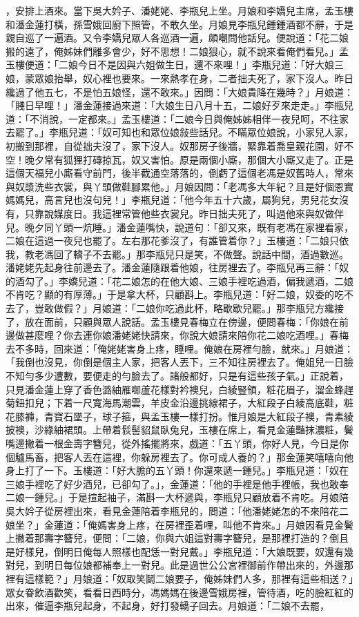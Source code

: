 ，安排上酒來。當下吳大妗子、潘姥姥、李瓶兒上坐。月娘和李嬌兒主席，孟玉樓和潘金蓮打橫，孫雪娥回廚下照管，不敢久坐。月娘見李瓶兒鍾鍾酒都不辭，于是親自巡了一遍酒。又令李嬌兒眾人各巡酒一遍，頗嘲問他話兒。便說道：「花二娘搬的遠了，俺姊妹們離多會少，好不思想！二娘狠心，就不說來看俺們看兒。」孟玉樓便道：「二娘今日不是因與六姐做生日，還不來哩！」李瓶兒道：「好大娘三娘，蒙眾娘抬舉，奴心裡也要來。一來熱孝在身，二者拙夫死了，家下沒人。昨日纔過了他五七，不是怕五娘怪，還不敢來。」因問：「大娘貴降在幾時？」月娘道：「賤日早哩！」潘金蓮接過來道：「大娘生日八月十五，二娘好歹來走走。」李瓶兒道：「不消說，一定都來。」孟玉樓道：「二娘今日與俺姊姊相伴一夜兒呵，不往家去罷了。」李瓶兒道：「奴可知也和眾位娘敍些話兒。不瞞眾位娘說，小家兒人家，初搬到那裡，自從拙夫沒了，家下沒人。奴那房子後牆，緊靠着喬皇親花園，好不空！晚夕常有狐狸打磚掠瓦，奴又害怕。原是兩個小廝，那個大小廝又走了。正是這個天福兒小廝看守前門，後半截通空落落的，倒虧了這個老馮是奴舊時人，常來與奴漿洗些衣裳，與丫頭做鞋腳累他。」月娘因問：「老馮多大年紀？且是好個恩實媽媽兒，高言兒也沒句兒！」李瓶兒道：「他今年五十六歲，屬狗兒，男兒花女沒有，只靠說媒度日。我這裡常管他些衣裳兒。昨日拙夫死了，叫過他來與奴做伴兒。晚夕同丫頭一炕睡。」潘金蓮嘴快，說道句：「卻又來，既有老馮在家裡看家，二娘在這過一夜兒也罷了。左右那花爹沒了，有誰管着你？」玉樓道：「二娘只依我，教老馮回了轎子不去罷。」那李瓶兒只是笑，不做聲。說話中間，酒過數巡。潘姥姥先起身往前邊去了。潘金蓮隨跟着他娘，往房裡去了。李瓶兒再三辭：「奴的酒勾了。」李嬌兒道：「花二娘怎的在他大娘、三娘手裡吃過酒，偏我遞酒，二娘不肯吃？顯的有厚薄。」于是拿大杯，只顧斟上。李瓶兒道：「好二娘，奴委的吃不去了，豈敢做假？」月娘道：「二娘你吃過此杯，略歇歇兒罷。」那李瓶兒方纔接了，放在面前，只顧與眾人說話。孟玉樓見春梅立在傍邊，便問春梅：「你娘在前邊做甚麼哩？你去連你娘潘姥姥快請來，你說大娘請來陪你花二娘吃酒哩。」春梅去不多時，回來道：「俺姥姥害身上疼，睡哩。俺娘在房裡勻臉，就來。」月娘道：「我倒也沒見，你倒是個主人家，把客人丟下，三不知往房裡去了。俺姐兒一日臉不知勻多少遭數，要便走的勻臉去了。諸般都好，只是有這些孩子氣。」正說着，只見潘金蓮上穿了香色潞紬雁啣蘆花樣對衿襖兒，白綾豎領，粧花眉子，溜金蜂趕菊鈕扣兒；下着一尺寬海馬潮雲，羊皮金沿邊挑線裙子，大紅段子白綾高底鞋，粧花膝褲，青寶石墜子，球子箍，與孟玉樓一樣打扮。惟月娘是大紅段子襖，青素綾披襖，沙綠紬裙頭。上帶着䯼髻貂鼠臥兔兒，玉樓在席上，看見金蓮豔抹濃粧，鬢嘴邊撇着一根金壽字簪兒，從外搖擺將來，戲道：「五丫頭，你好人見，今日是你個驢馬畜，把客人丟在這裡，你躲房裡去了。你可成人養的？」那金蓮笑嘻嘻向他身上打了一下。玉樓道：「好大膽的五丫頭！你還來遞一鍾兒。」李瓶兒道：「奴在三娘手裡吃了好少酒兒，已卻勾了。」，金蓮道：「他的手裡是他手裡帳，我也敢奉二娘一鍾兒。」于是揎起袖子，滿斟一大杯遞與，李瓶兒只顧放着不肯吃。月娘陪吳大妗子從房裡出來，看見金蓮陪着李瓶兒的，問道：「他潘姥姥怎的不來陪花二娘坐？」金蓮道：「俺媽害身上疼，在房裡歪着哩，叫他不肯來。」月娘因看見金鬢上撇着那壽字簪兒，便問：「二娘，你與六姐這對壽字簪兒，是那裡打造的？倒且是好樣兒，倒明日俺每人照樣也配恁一對兒戴。」李瓶兒道：「大娘既要，奴還有幾對兒，到明日每位娘都補奉上一對兒。此是過世公公宮裡御前作帶出來的，外邊那裡有這樣範？」月娘道：「奴取笑鬬二娘要子，俺姊妹們人多，那裡有這些相送？」眾女眷飲酒歡笑，看看日西時分，馮媽媽在後邊雪娥房裡，管待酒，吃的臉紅紅的出來，催逼李瓶兒起身，不起身，好打發轎子回去。月娘道：「二娘不去罷，